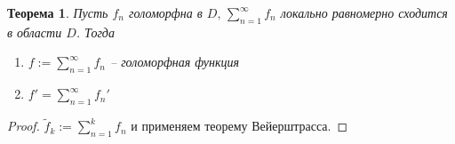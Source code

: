 \documentclass[a4paper,12pt]{article}
\theoremstyle{plain}
\newtheorem{theorem}{Теорема}[section]
\theoremstyle{definition}
\theoremstyle{remark}
\begin{document}
\begin{theorem}
	Пусть $f_n$ голоморфна в $D,\, \sum_{n = 1}^\infty f_n$ локально равномерно сходится в области $D$. Тогда
	\begin{enumerate}
		\item $f := \sum_{n = 1}^\infty f_n$ -- голоморфная функция
		\item $f' = \sum_{n = 1}^\infty f_n'$
	\end{enumerate}
\end{theorem} 

\begin{proof}
	$\tilde{f}_k := \sum_{n = 1}^k f_n$ и применяем теорему Вейерштрасса.
\end{proof}
\end{document}
